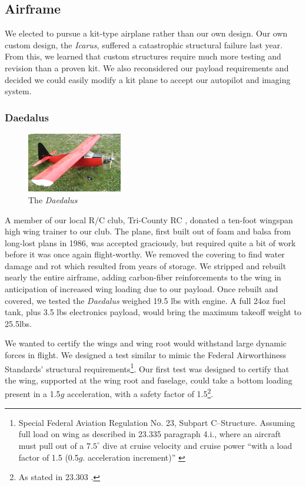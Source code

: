 \documentclass[10pt,twocolumns]{report}
\newcommand{\degrees}[1]
{
\begin{math}
#1^{\circ} 
\end{math}
}
\begin{document}
\subsection{Airframe}

We elected to pursue a kit-type airplane rather than our own design. 
Our own custom design, the \emph{Icarus}, suffered a catastrophic structural failure last year. From this, we learned that custom structures require much more testing and revision than a proven kit. We also reconsidered our payload requirements and decided we could easily modify a kit plane to accept our autopilot and imaging system.



\subsubsection{Daedalus}
\begin{figure}
	\includegraphics[width=0.37\textwidth]{../images/daedalus_isometric.jpg}
	\caption{The \emph{Daedalus}}
	\label{fig:daedalus}
\end{figure}
A member of our local R/C club, Tri-County RC \cite{tricountyRC}, donated a ten-foot wingspan high wing trainer to our club. The plane, first built out of foam and balsa from long-lost plans in 1986, was accepted graciously, but required quite a bit of work before it was once again flight-worthy. We removed the covering to find water damage and rot which resulted from years of storage. We stripped and rebuilt nearly the entire airframe, adding carbon-fiber reinforcements to the wing in anticipation of increased wing loading due to our payload. Once rebuilt and covered, we tested the \emph{Daedalus} weighed 19.5 lbs with engine. A full 24oz fuel tank, plus 3.5 lbs electronics payload, would bring the maximum takeoff weight to 25.5lbs.

We wanted to certify the wings and wing root would withstand large dynamic forces in flight. 
We designed a test similar to mimic the 
Federal Airworthiness Standards' structural requirements\footnote{Special Federal Aviation Regulation No. 23, Subpart C--Structure. Assuming full load on wing as described in 23.335 paragraph 4.i., where an aircraft must pull out of a \degrees{7.5} dive at cruise velocity and cruise power ``with a load factor of 1.5 (0.5$g$. acceleration increment)'' \cite{far23}}. Our first test was designed to certify that the wing, supported at the wing root and fuselage, could take a bottom loading present in a 1.5$g$ acceleration, with a safety factor of 1.5\footnote{As stated in 23.303 \cite{far23}.}.
\end{document}
